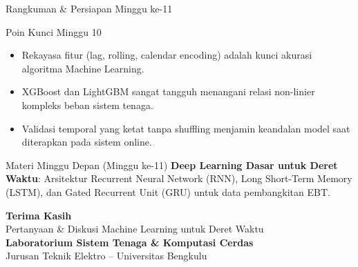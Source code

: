 \documentclass[aspectratio=169, 10pt]{beamer}
\begin{document}
\begin{frame}{Rangkuman \& Persiapan Minggu ke-11}
    \begin{block}{Poin Kunci Minggu 10}
        \begin{itemize}
            \item Rekayasa fitur (lag, rolling, calendar encoding) adalah kunci akurasi algoritma Machine Learning.
            \item XGBoost dan LightGBM sangat tangguh menangani relasi non-linier kompleks beban sistem tenaga.
            \item Validasi temporal yang ketat tanpa shuffling menjamin keandalan model saat diterapkan pada sistem online.
        \end{itemize}
    \end{block}
    \vspace{0.2cm}
    \begin{alertblock}{Materi Minggu Depan (Minggu ke-11)}
        \textbf{Deep Learning Dasar untuk Deret Waktu}: Arsitektur Recurrent Neural Network (RNN), Long Short-Term Memory (LSTM), dan Gated Recurrent Unit (GRU) untuk data pembangkitan EBT.
    \end{alertblock}
\end{frame}

\begin{frame}[plain]
    \begin{center}
        \vspace{1.5cm}
        {\Huge \color{mainblue} \textbf{Terima Kasih}}\\[0.4cm]
        {\large Pertanyaan \& Diskusi Machine Learning untuk Deret Waktu}\\[1.2cm]
        \textbf{Laboratorium Sistem Tenaga \& Komputasi Cerdas}\\
        Jurusan Teknik Elektro -- Universitas Bengkulu
    \end{center}
\end{frame}
\end{document}
